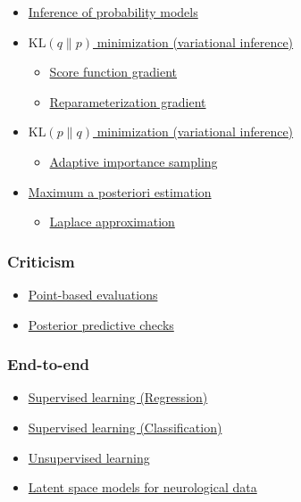 \begin{itemize}
  \item \href{tut_inference.html}{Inference of probability models}
  \item \href{tut_KLqp.html}{$\text{KL}(q\|p)$ minimization (variational
  inference)}
  \begin{itemize}
    \item \href{tut_KLqp_score.html}{Score function gradient}
    \item \href{tut_KLqp_reparam.html}{Reparameterization gradient}
  \end{itemize}
  \item \href{tut_KLpq.html}{$\text{KL}(p\|q)$ minimization (variational
  inference)}
  \begin{itemize}
    \item \href{tut_KLpq_ais.html}{Adaptive importance sampling}
  \end{itemize}
  \item \href{tut_MAP.html}{Maximum a posteriori estimation}
  \begin{itemize}
    \item \href{tut_MAP_Laplace.html}{Laplace approximation}
  \end{itemize}
\end{itemize}

\subsubsection{Criticism}

\begin{itemize}
  \item \href{tut_point_eval.html}{Point-based evaluations}
  \item \href{tut_PPC.html}{Posterior predictive checks}
\end{itemize}

\subsubsection{End-to-end}

\begin{itemize}
  \item \href{tut_supervised_regression.html}{Supervised learning (Regression)}
  \item \href{tut_supervised_classification.html}{Supervised learning (Classification)}
  \item \href{tut_unsupervised.html}{Unsupervised learning}
  \item \href{tut_latent_space_models.html}{Latent space models for neurological data}
\end{itemize}
